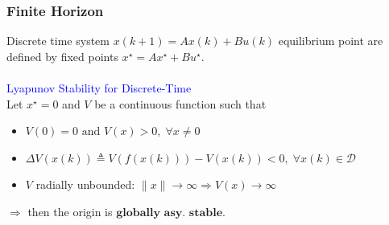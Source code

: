 \subsubsection*{Finite Horizon}
Discrete time system $x(k + 1) = A x(k) + B u(k)$ equilibrium point are defined by fixed points $x^\star = A x^\star + B u^\star$.\\ \\
\textcolor{blue}{Lyapunov Stability for Discrete-Time}\\
Let $x^\star = 0$ and $V$ be a continuous function such that
\begin{itemize}
    \item $V(0) = 0 \text{ and } V(x) > 0, \; \forall x \neq 0$
    \item $\Delta V(x(k)) \triangleq V(f(x(k))) - V(x(k)) < 0, \; \forall x(k) \in \mathcal{D}$
    \item $V$ radially unbounded: $\|x\| \to \infty \Rightarrow V(x) \to \infty$
\end{itemize}
$\Rightarrow$ then the origin is $\textbf{globally asy. stable}$.


